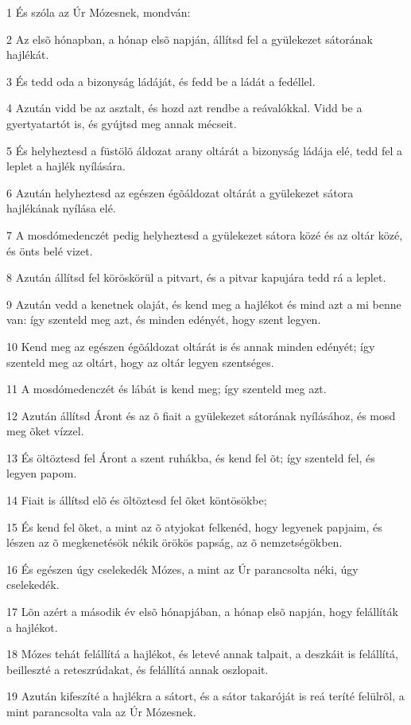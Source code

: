 \par 1 És szóla az Úr Mózesnek, mondván:
\par 2 Az elsõ hónapban, a hónap elsõ napján, állítsd fel a gyülekezet sátorának hajlékát.
\par 3 És tedd oda a bizonyság ládáját, és fedd be a ládát a fedéllel.
\par 4 Azután vidd be az asztalt, és hozd azt rendbe a reávalókkal. Vidd be a gyertyatartót is, és gyújtsd meg annak mécseit.
\par 5 És helyheztesd a füstölõ áldozat arany oltárát a bizonyság ládája elé, tedd fel a leplet a hajlék nyílására.
\par 6 Azután helyheztesd az egészen égõáldozat oltárát a gyülekezet sátora hajlékának nyílása elé.
\par 7 A mosdómedenczét pedig helyheztesd a gyülekezet sátora közé és az oltár közé, és önts belé vizet.
\par 8 Azután állítsd fel köröskörül a pitvart, és a pitvar kapujára tedd rá a leplet.
\par 9 Azután vedd a kenetnek olaját, és kend meg a hajlékot és mind azt a mi benne van: így szenteld meg azt, és minden edényét, hogy szent legyen.
\par 10 Kend meg az egészen égõáldozat oltárát is és annak minden edényét; így szenteld meg az oltárt, hogy az oltár legyen szentséges.
\par 11 A mosdómedenczét és lábát is kend meg; így szenteld meg azt.
\par 12 Azután állítsd Áront és az õ fiait a gyülekezet sátorának nyílásához, és mosd meg õket vízzel.
\par 13 És öltöztesd fel Áront a szent ruhákba, és kend fel õt; így szenteld fel, és legyen papom.
\par 14 Fiait is állítsd elõ és öltöztesd fel õket köntösökbe;
\par 15 És kend fel õket, a mint az õ atyjokat felkenéd, hogy legyenek papjaim, és lészen az õ megkenetésök nékik örökös papság, az õ nemzetségökben.
\par 16 És egészen úgy cselekedék Mózes, a mint az Úr parancsolta néki, úgy cselekedék.
\par 17 Lõn azért a második év elsõ hónapjában, a hónap elsõ napján, hogy felállíták a hajlékot.
\par 18 Mózes tehát felállítá a hajlékot, és letevé annak talpait, a deszkáit is felállítá, beilleszté a reteszrúdakat, és felállítá annak oszlopait.
\par 19 Azután kifeszíté a hajlékra a sátort, és a sátor takaróját is reá teríté felülrõl, a mint parancsolta vala az Úr Mózesnek.
